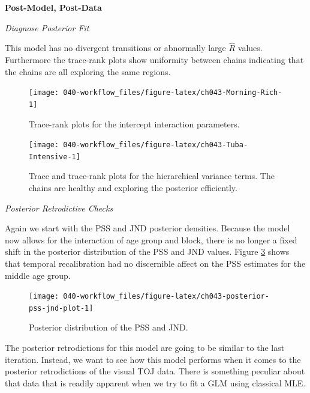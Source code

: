 \documentclass[11pt, oneside, openany]{scrbook}
\begin{document}
\textbf{Post-Model, Post-Data}

\emph{Diagnose Posterior Fit}

This model has no divergent transitions or abnormally large \(\hat{R}\) values. Furthermore the trace-rank plots show uniformity between chains indicating that the chains are all exploring the same regions.

\begin{figure}

{\centering \texttt{[image: 040-workflow\_files/figure-latex/ch043-Morning-Rich-1]} 

}

\caption{Trace-rank plots for the intercept interaction parameters.}\label{fig:ch043-Morning-Rich}
\end{figure}

\begin{figure}

{\centering \texttt{[image: 040-workflow\_files/figure-latex/ch043-Tuba-Intensive-1]} 

}

\caption{Trace and trace-rank plots for the hierarchical variance terms. The chains are healthy and exploring the posterior efficiently.}\label{fig:ch043-Tuba-Intensive}
\end{figure}

\emph{Posterior Retrodictive Checks}

Again we start with the PSS and JND posterior densities. Because the model now allows for the interaction of age group and block, there is no longer a fixed shift in the posterior distribution of the PSS and JND values. Figure \ref{fig:ch043-posterior-pss-jnd-plot} shows that temporal recalibration had no discernible affect on the PSS estimates for the middle age group.

\begin{figure}

{\centering \texttt{[image: 040-workflow\_files/figure-latex/ch043-posterior-pss-jnd-plot-1]} 

}

\caption{Posterior distribution of the PSS and JND.}\label{fig:ch043-posterior-pss-jnd-plot}
\end{figure}

The posterior retrodictions for this model are going to be similar to the last iteration. Instead, we want to see how this model performs when it comes to the posterior retrodictions of the visual TOJ data. There is something peculiar about that data that is readily apparent when we try to fit a GLM using classical MLE.
\end{document}
